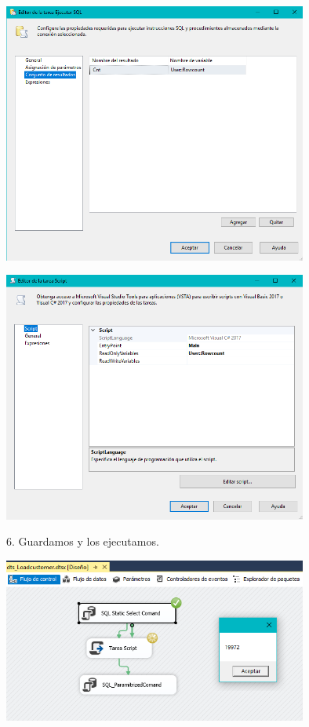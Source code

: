 	\begin{center}
	\includegraphics[width=10cm]{imagenes/img25}
    \end{center}	
    
	\begin{center}
	\includegraphics[width=10cm]{imagenes/img26}
    \end{center}	

6. Guardamos y los ejecutamos.
    \begin{center}
	\includegraphics[width=10cm]{imagenes/img27}
	\end{center}	